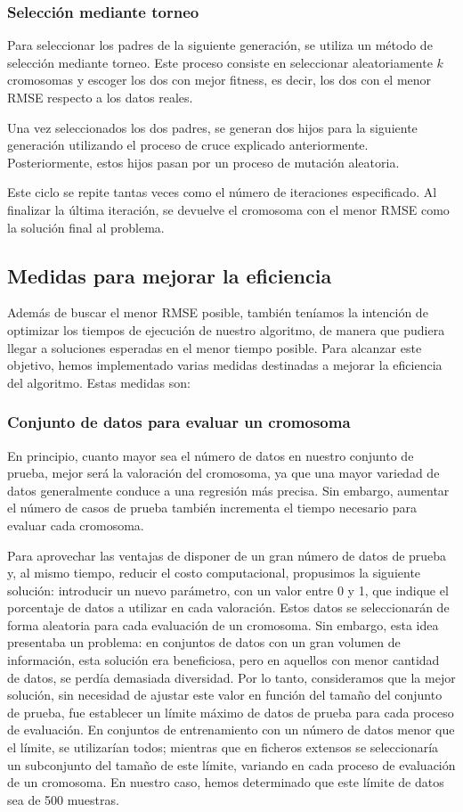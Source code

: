 \documentclass[conference,a4paper]{IEEEtran}
\begin{document}
\subsubsection{Selección mediante torneo}
Para seleccionar los padres de la siguiente generación, se utiliza un método de selección mediante torneo. Este proceso consiste en seleccionar aleatoriamente \(k\) cromosomas y escoger los dos con mejor fitness, es decir, los dos con el menor RMSE respecto a los datos reales.

Una vez seleccionados los dos padres, se generan dos hijos para la siguiente generación utilizando el proceso de cruce explicado anteriormente. Posteriormente, estos hijos pasan por un proceso de mutación aleatoria. 

Este ciclo se repite tantas veces como el número de iteraciones especificado. Al finalizar la última iteración, se devuelve el cromosoma con el menor RMSE como la solución final al problema.


\subsection{Medidas para mejorar la eficiencia}
Además de buscar el menor RMSE posible, también teníamos la intención de optimizar los tiempos de ejecución de nuestro algoritmo, de manera que pudiera llegar a soluciones esperadas en el menor tiempo posible. Para alcanzar este objetivo, hemos implementado varias medidas destinadas a mejorar la eficiencia del algoritmo. Estas medidas son:

\subsubsection{Conjunto de datos para evaluar un cromosoma}

En principio, cuanto mayor sea el número de datos en nuestro conjunto de prueba, mejor será la valoración del cromosoma, ya que una mayor variedad de datos generalmente conduce a una regresión más precisa. Sin embargo, aumentar el número de casos de prueba también incrementa el tiempo necesario para evaluar cada cromosoma.

Para aprovechar las ventajas de disponer de un gran número de datos de prueba y, al mismo tiempo, reducir el costo computacional, propusimos la siguiente solución: introducir un nuevo parámetro, con un valor entre 0 y 1, que indique el porcentaje de datos a utilizar en cada valoración. Estos datos se seleccionarán de forma aleatoria para cada evaluación de un cromosoma. Sin embargo, esta idea presentaba un problema: en conjuntos de datos con un gran volumen de información, esta solución era beneficiosa, pero en aquellos con menor cantidad de datos, se perdía demasiada diversidad. Por lo tanto, consideramos que la mejor solución, sin necesidad de ajustar este valor en función del tamaño del conjunto de prueba, fue establecer un límite máximo de datos de prueba para cada proceso de evaluación. En conjuntos de entrenamiento con un número de datos menor que el límite, se utilizarían todos; mientras que en ficheros extensos se seleccionaría un subconjunto del tamaño de este límite, variando en cada proceso de evaluación de un cromosoma. En nuestro caso, hemos determinado que este límite de datos sea de 500 muestras.
\end{document}
